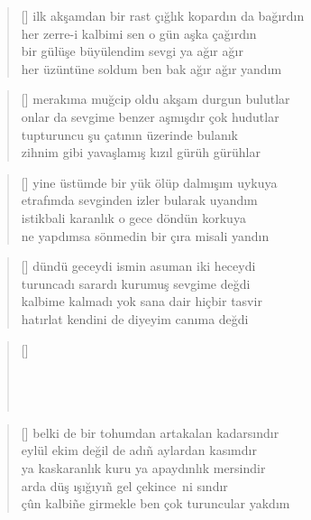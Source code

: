 \documentclass[a5paper, openright, twoside]{memoir}
\begin{document}
\begin{verse}[\versewidth]
  ilk akşamdan bir rast çığlık kopardın da bağırdın \\
  her zerre-i kalbimi sen o gün aşka çağırdın \\
  bir gülüşe büyülendim sevgi ya ağır ağır \\
  her üzüntüne soldum ben bak ağır ağır yandım \\
\end{verse}
\begin{verse}[\versewidth]
  merakıma muğcip oldu akşam durgun bulutlar \\
  onlar da sevgime benzer aşmışdır çok hudutlar \\
  tupturuncu şu çatının üzerinde bulanık \\
  zihnim gibi yavaşlamış kızıl gürüh gürühlar \\
\end{verse}
\begin{verse}[\versewidth]
  yine üstümde bir yük ölüp dalmışım uykuya \\
  etrafımda sevginden izler bularak uyandım \\
  istikbali karanlık o gece döndün korkuya \\
  ne yapdımsa sönmedin bir çıra misali yandın \\
\end{verse}
\begin{verse}[\versewidth]
  dündü geceydi ismin asuman iki heceydi \\
  turuncadı sarardı kurumuş sevgime değdi \\
  kalbime kalmadı yok sana dair hiçbir tasvir \\
  hatırlat kendini de diyeyim canıma değdi \\
\end{verse}
\begin{verse}[\versewidth]
  \phantom{}\\
  \phantom{}\\
  \phantom{}\\
  \phantom{}\\
\end{verse}
\begin{verse}[\versewidth]
  belki de bir tohumdan artakalan kadarsındır \\
  eylül ekim değil de adı\~n aylardan kasımdır \\
  ya kaskaranlık kuru ya apaydınlık mersindir \\
  arda düş ışığıyı\~n gel çekince~ni sındır \\
  çûn kalbi\~ne girmekle ben çok turuncular yakdım \\
\end{verse}
\end{document}

